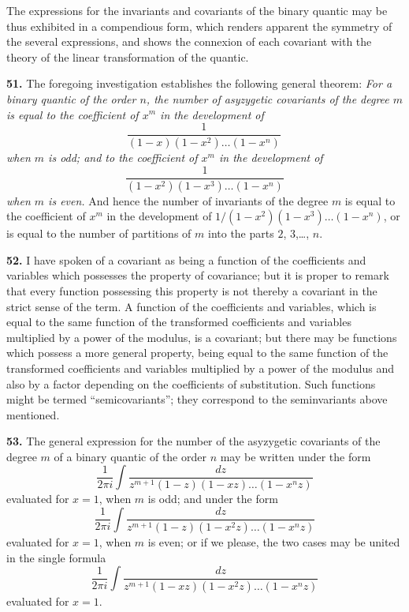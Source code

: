 \documentclass[11pt,a4paper]{article}
\begin{document}
The expressions for the invariants and covariants of the binary quantic may be thus exhibited in a compendious form, which renders apparent the symmetry of the several expressions, and shows the connexion of each covariant with the theory of the linear transformation of the quantic.

\clearpage
\setcounter{page}{269}

\textbf{51.} The foregoing investigation establishes the following general theorem: \textit{For a binary quantic of the order $n$, the number of asyzygetic covariants of the degree $m$ is equal to the coefficient of $x^{m}$ in the development of}
\[
\frac{1}{(1-x)(1-x^{2})\ldots(1-x^{n})}\,
\]
\textit{when $m$ is odd; and to the coefficient of $x^{m}$ in the development of}
\[
\frac{1}{(1-x^{2})(1-x^{3})\ldots(1-x^{n})}
\]
\textit{when $m$ is even.} And hence the number of invariants of the degree $m$ is equal to the coefficient of $x^{m}$ in the development of $1/(1-x^{2})(1-x^{3})\ldots(1-x^{n})$, or is equal to the number of partitions of $m$ into the parts $2$, $3$,\ldots, $n$.

\textbf{52.} I have spoken of a covariant as being a function of the coefficients and variables which possesses the property of covariance; but it is proper to remark that every function possessing this property is not thereby a covariant in the strict sense of the term. A function of the coefficients and variables, which is equal to the same function of the transformed coefficients and variables multiplied by a power of the modulus, is a covariant; but there may be functions which possess a more general property, being equal to the same function of the transformed coefficients and variables multiplied by a power of the modulus and also by a factor depending on the coefficients of substitution. Such functions might be termed ``semicovariants''; they correspond to the seminvariants above mentioned.

\textbf{53.} The general expression for the number of the asyzygetic covariants of the degree $m$ of a binary quantic of the order $n$ may be written under the form
\[
\frac{1}{2\pi i}\int \frac{dz}{z^{m+1}(1-z)(1-xz)\ldots(1-x^{n}z)}
\]
evaluated for $x=1$, when $m$ is odd; and under the form
\[
\frac{1}{2\pi i}\int \frac{dz}{z^{m+1}(1-z)(1-x^{2}z)\ldots(1-x^{n}z)}
\]
evaluated for $x=1$, when $m$ is even; or if we please, the two cases may be united in the single formula
\[
\frac{1}{2\pi i}\int \frac{dz}{z^{m+1}(1-xz)(1-x^{2}z)\ldots(1-x^{n}z)}
\]
evaluated for $x=1$.
\end{document}
